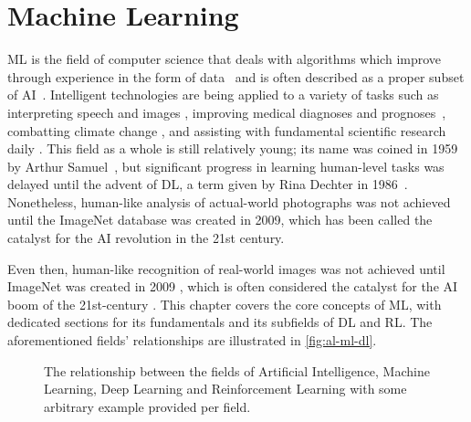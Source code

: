 \chapter{Machine Learning}\label{chap:machine_learning}

\Gls{ML} is the field of computer science that deals with algorithms which improve through experience in the form of data~\cite{Mitchell97} and is often described as a proper subset of AI~\cite{Goodfellow-et-al-2016}. Intelligent technologies are being applied to a variety of tasks such as interpreting speech and images \cite{Farabet2013,Girshick2013,Chen2014,He2014,Shelhamer2014,Girshick2015,Ren2015,Redmon2015}, improving medical diagnoses and prognoses~\cite{Kourou2015, Abbasi2019, Singh2019, Rajkomar2019, May2021}, combatting climate change \cite{Rolnick2023}, and assisting with fundamental scientific research daily \cite{Libbrecht2015}. This field as a whole is still relatively young; its name was coined in 1959 by Arthur Samuel~\cite{5392560}, but significant progress in learning human-level tasks was delayed until the advent of \gls{DL}, a term given by Rina Dechter in 1986~\cite{Rina1986}. Nonetheless, human-like analysis of actual-world photographs was not achieved until the ImageNet database was created in 2009, which has been called the catalyst for the \gls{AI} revolution in the 21st century.



Even then, human-like recognition of real-world images was not achieved until ImageNet was created in 2009 \cite{5206848}, which is often considered the catalyst for the AI boom of the 21st-century \cite{hardy_2016}. This chapter covers the core concepts of \gls{ML}, with dedicated sections for its fundamentals and its subfields of \gls{DL} and \gls{RL}. The aforementioned fields' relationships are illustrated in \autoref{fig:al-ml-dl}.

\begin{figure}[htp!]
    \centering
    
    \captionsetup{format=hang} %
    \caption{
        The relationship between the fields of Artificial Intelligence,
        Machine Learning, Deep Learning and Reinforcement Learning with some
        arbitrary example provided per field.
    }
    \label{fig:al-ml-dl}
\end{figure}

